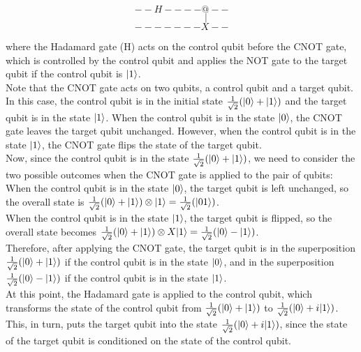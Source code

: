 \documentclass{article}
\begin{document}
	\[--H----@-- \]
	\[\qquad \qquad \quad | \]
	\[-------X--\]

	where the Hadamard gate (H) acts on the control qubit before the CNOT gate, which is controlled by the control qubit and applies the NOT gate to the target qubit if the control qubit is $ |1\rangle $. \\
	
	Note that the CNOT gate acts on two qubits, a control qubit and a target qubit. In this case, the control qubit is in the initial state $\frac{1}{\sqrt{2}}( |0\rangle  +  |1\rangle )$ and the target qubit is in the state $ |1\rangle $. When the control qubit is in the state $ |0\rangle $, the CNOT gate leaves the target qubit unchanged. However, when the control qubit is in the state $ |1\rangle $, the CNOT gate flips the state of the target qubit. \\
	
	Now, since the control qubit is in the state $\frac{1}{\sqrt{2}}( |0\rangle  +  |1\rangle )$, we need to consider the two possible outcomes when the CNOT gate is applied to the pair of qubits: \\
	
	When the control qubit is in the state $ |0\rangle $, the target qubit is left unchanged, so the overall state is $\frac{1}{\sqrt{2}}( |0\rangle  +  |1\rangle ) \otimes  |1\rangle  = \frac{1}{\sqrt{2}}( |01\rangle )$. \\
	
	When the control qubit is in the state $ |1\rangle $, the target qubit is flipped, so the overall state becomes $\frac{1}{\sqrt{2}}( |0\rangle  +  |1\rangle ) \otimes X |1\rangle  = \frac{1}{\sqrt{2}}( |0\rangle  -  |1\rangle )$. \\
	
	Therefore, after applying the CNOT gate, the target qubit is in the superposition $\frac{1}{\sqrt{2}}( |0\rangle  +  |1\rangle )$ if the control qubit is in the state $ |0\rangle $, and in the superposition $\frac{1}{\sqrt{2}}( |0\rangle  -  |1\rangle )$ if the control qubit is in the state $ |1\rangle $. \\
	
	At this point, the Hadamard gate is applied to the control qubit, which transforms the state of the control qubit from $\frac{1}{\sqrt{2}}( |0\rangle  +  |1\rangle )$ to $\frac{1}{\sqrt{2}}( |0\rangle  + i |1\rangle )$. This, in turn, puts the target qubit into the state $\frac{1}{\sqrt{2}}( |0\rangle  + i |1\rangle )$, since the state of the target qubit is conditioned on the state of the control qubit. \\
	
\end{document}
